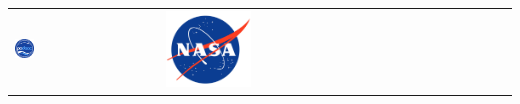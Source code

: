 \begin{center}
\begin{tabular}{m{} m{} m{} m{} m{}}
    \includegraphics[width=0.2\textwidth]{../images/logo-podaac.png} & &  & & \includegraphics[width=0.25\textwidth]{../images/logo-nasa.jpg}\\ 
\end{tabular}
\end{center}





